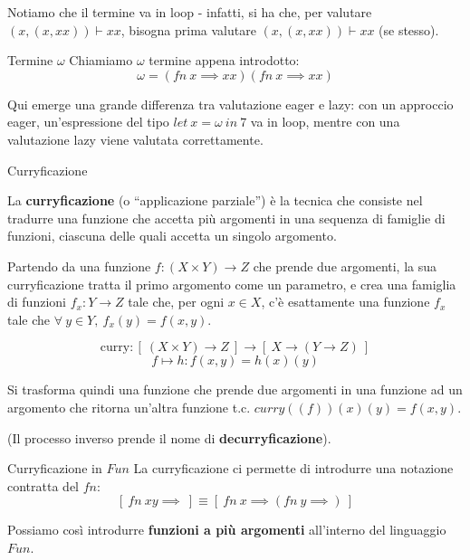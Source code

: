 \documentclass[a4paper,11pt]{report}
\begin{document}
Notiamo che il termine va in loop - infatti, si ha che, per valutare \((x, (x,xx))\vdash  xx \), bisogna prima valutare \((x, (x,xx))\vdash  xx \) (se stesso).

\begin{gbox}{Termine \( \omega \)}
    Chiamiamo \( \omega \) termine appena introdotto:
    \[ \omega =  (fn \ x \implies xx)(fn \ x \implies xx) \]

    
\end{gbox}

Qui emerge una grande differenza tra valutazione eager e lazy: con un approccio eager, un'espressione del tipo \( let \ x = \omega \ in \ 7 \) va in loop, mentre con una valutazione lazy viene valutata correttamente.


\begin{defbox}{Curryficazione}{}

    La \textbf{curryficazione} (o ``applicazione parziale'') è la tecnica che consiste nel tradurre una funzione che accetta più argomenti in una sequenza di famiglie di funzioni, ciascuna delle quali accetta un singolo argomento.


    Partendo da una funzione \( f: (X \times Y) \to Z\) che prende due argomenti, la sua curryficazione tratta il primo argomento come un parametro, e crea una famiglia di funzioni \( f_x : Y \to Z \) tale che, per ogni \( x \in X  \), c'è esattamente una funzione \( f_x \) tale che \( \forall \ y \in Y , \  f_x(y)=f(x,y)\).

    \[ \text{curry}: [ \ (X \times Y) \to Z \ ] \to [ \ X \to (Y \to Z) \ ]\]
    \[ f \mapsto h : f(x, y) = h(x)(y) \]


Si trasforma quindi una funzione che prende due argomenti in una funzione ad un argomento che ritorna un'altra funzione t.c. \( curry((f))(x)(y) = f(x, y) \).

(Il processo inverso prende il nome di \textbf{decurryficazione}).

\end{defbox}

\begin{gbox}[colback=DeepGreenLight, colframe=DeepGreen, colbacktitle=DeepGreen]{Curryficazione in \( Fun \)}
    La curryficazione ci permette di introdurre una notazione contratta del \( fn \):
    \[ [ \ fn \ x y \implies \ ] \equiv [ \ fn \ x \implies ( fn \ y \implies ) \ ]\]

    Possiamo così introdurre \textbf{funzioni a più argomenti} all'interno del linguaggio \( Fun \).

\end{gbox}
\end{document}
